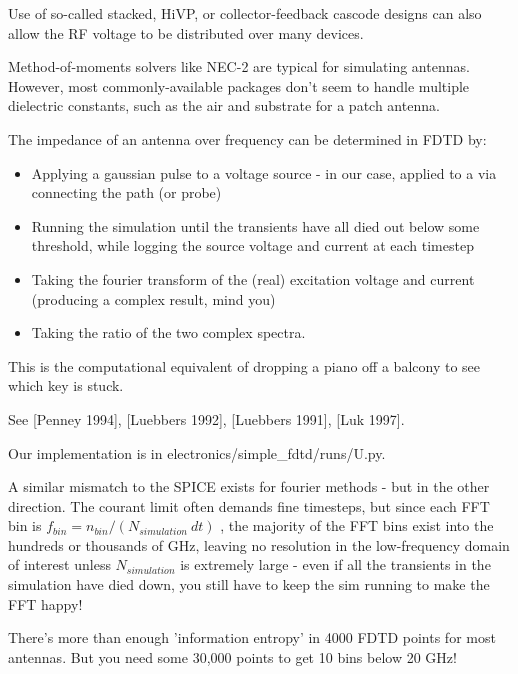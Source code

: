 \documentclass[paper.tex]{subfiles}
\begin{document}
Use of so-called stacked, HiVP, or collector-feedback cascode designs can also allow the RF voltage to be distributed over many devices.








\clearpage
{}

Method-of-moments solvers like NEC-2 are typical for simulating antennas. However, most commonly-available packages don't seem to handle multiple dielectric constants, such as the air and substrate for a patch antenna.

The impedance of an antenna over frequency can be determined in FDTD by:

\begin{itemize}
  \item Applying a gaussian pulse to a voltage source - in our case, applied to a via connecting the path (or probe)
  \item Running the simulation until the transients have all died out below some threshold, while logging the source voltage and current at each timestep
  \item Taking the fourier transform of the (real) excitation voltage and current (producing a complex result, mind you)
  \item Taking the ratio of the two complex spectra.
\end{itemize}

This is the computational equivalent of dropping a piano off a balcony to see which key is stuck.

See [Penney 1994], [Luebbers 1992], [Luebbers 1991], [Luk 1997]. 

Our implementation is in electronics/simple\_fdtd/runs/U.py.

A similar mismatch to the SPICE exists for fourier methods - but in the other direction.  The courant limit often demands fine timesteps, but since each FFT bin is $ f_{bin} = n_{bin} / (N_{simulation} \ dt) $ , the majority of the FFT bins exist into the hundreds or thousands of GHz, leaving no resolution in the low-frequency domain of interest unless $N_{simulation}$ is extremely large - even if all the transients in the simulation have died down, you still have to keep the sim running to make the FFT happy! 

There's more than enough 'information entropy' in 4000 FDTD points for most antennas. But you need some 30,000 points to get 10 bins below 20 GHz!
\end{document}
